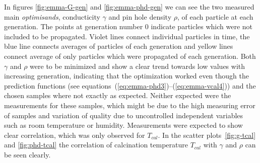 In figures \ref{fig:emma-G-gen} and \ref{fig:emma-phd-gen} we can see the two measured main \textit{optimisands}, 
conducticity $\gamma$ and pin hole density $\rho$, of each particle at each generation.
The points at generation number 0 indicate particles which were not included to be propagated. 
Violet lines connect individual particles in time, the blue line connects averages of particles of each generation and yellow lines connect average of only particles which were propagated of each generation. 
%
Both $\gamma$ and $\rho$ were to be minimized and show a clear trend towards low values with increasing generation, 
indicating that the optimization worked even though 
the prediction functions (see equations~(\ref{eq:emma-phd3})--(\ref{eq:emma-vcal4})) 
and the chosen samples where not exactly as expected. 
Neither expected were the measurements for these samples, which might be due to the high measuring error of samples and variation of quality due to uncontrolled independent variables such as room temperature or humidity. 
Measurements were expected to show clear correlation, which was only observed for $T_{cal}$.
%
In the scatter plots~\ref{fig:g-tcal} and \ref{fig:phd-tcal} the correlation of calcination temperature $T_{cal}$ with $\gamma$ and $\rho$ can be seen clearly. 

